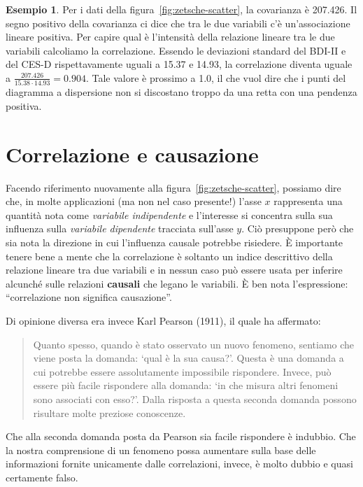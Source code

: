 \documentclass[
  10pt,
  italian,
  a4paper,
  extrafontsizes,onecolumn,openright
  ]{memoir}
\theoremstyle{definition}
\theoremstyle{definition}
\newtheorem{example}{Esempio}[chapter]
\theoremstyle{definition}
\theoremstyle{definition}
\theoremstyle{remark}
\begin{document}
\begin{example}
Per i dati della figura~\ref{fig:zetsche-scatter}, la covarianza è 207.426. Il segno positivo della covarianza ci dice che tra le due variabili c'è un'associazione lineare positiva. Per capire qual è l'intensità della relazione lineare tra le due variabili calcoliamo la correlazione.
Essendo le deviazioni standard del BDI-II e del CES-D rispettavamente uguali a 15.37 e 14.93, la correlazione diventa uguale a \(\frac{207.426}{15.38 \cdot 14.93} = 0.904.\) Tale valore è prossimo a 1.0, il che vuol dire che i punti del diagramma a dispersione non si discostano troppo da una retta con una pendenza positiva.
\end{example}

\hypertarget{correlazione-e-causazione}{%
\section{Correlazione e causazione}\label{correlazione-e-causazione}}

Facendo riferimento nuovamente alla figura~\ref{fig:zetsche-scatter}, possiamo dire che, in molte applicazioni (ma non nel caso presente!) l'asse \(x\) rappresenta una quantità nota come \emph{variabile indipendente} e l'interesse si concentra sulla sua influenza sulla \emph{variabile dipendente} tracciata sull'asse \(y\). Ciò presuppone però che sia nota la direzione in cui l'influenza causale potrebbe risiedere. È importante tenere bene a mente che la correlazione è soltanto un indice descrittivo della relazione lineare tra due variabili e in nessun caso può essere usata per inferire alcunché sulle relazioni \textbf{causali} che legano le variabili. È ben nota l'espressione: ``correlazione non significa causazione''.

Di opinione diversa era invece Karl Pearson (1911), il quale ha affermato:

\begin{quote}
Quanto spesso, quando è stato osservato un nuovo fenomeno,
sentiamo che viene posta la domanda: `qual è la sua causa?'. Questa è
una domanda a cui potrebbe essere assolutamente impossibile rispondere.
Invece, può essere più facile rispondere alla domanda: `in che misura
altri fenomeni sono associati con esso?'. Dalla risposta a questa
seconda domanda possono risultare molte preziose conoscenze.
\end{quote}

Che alla seconda domanda posta da Pearson sia facile rispondere è indubbio. Che la nostra comprensione di un fenomeno possa aumentare sulla base delle
informazioni fornite unicamente dalle correlazioni, invece, è molto dubbio e quasi certamente falso.
\end{document}
